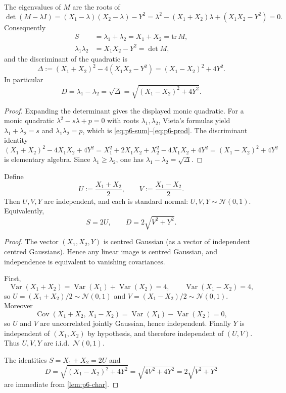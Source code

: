 \documentclass[11pt,a4paper]{article}
\DeclareMathOperator{\Var}{Var}
\DeclareMathOperator{\Cov}{Cov}
\begin{document}
\begin{lemma}
\label{lem:p6-char}
The eigenvalues of \(M\) are the roots of
\[
\det(M-\lambda I)
=
(X_1-\lambda)(X_2-\lambda)-Y^2
=
\lambda^2-(X_1+X_2)\lambda+(X_1X_2-Y^2)
=
0.
\]
Consequently
\begin{align}
\label{eq:p6-sum}
S
&=
\lambda_1+\lambda_2
=
X_1+X_2
=
\mathrm{tr}\,M,
\\
\label{eq:p6-prod}
\lambda_1\lambda_2
&=
X_1X_2-Y^2
=
\det M,
\end{align}
and the discriminant of the quadratic is
\begin{equation}
\label{eq:p6-delta}
\Delta
:=
(X_1+X_2)^2-4(X_1X_2-Y^2)
=
(X_1-X_2)^2+4Y^2.
\end{equation}
In particular
\begin{equation}
\label{eq:p6-diff}
D
=
\lambda_1-\lambda_2
=
\sqrt{\Delta}
=
\sqrt{(X_1-X_2)^2+4Y^2}.
\end{equation}
\end{lemma}

\begin{proof}
Expanding the determinant gives the displayed monic quadratic. For a monic quadratic \(\lambda^2-s\lambda+p=0\) with roots \(\lambda_1,\lambda_2\), Vieta's formulas yield \(\lambda_1+\lambda_2=s\) and \(\lambda_1\lambda_2=p\), which is \eqref{eq:p6-sum}--\eqref{eq:p6-prod}. The discriminant identity
\[
(X_1+X_2)^2-4X_1X_2+4Y^2
=
X_1^2+2X_1X_2+X_2^2-4X_1X_2+4Y^2
=
(X_1-X_2)^2+4Y^2
\]
is elementary algebra. Since \(\lambda_1\ge\lambda_2\), one has \(\lambda_1-\lambda_2=\sqrt{\Delta}\).
\end{proof}

\begin{lemma}
\label{lem:p6-UV}
Define
\[
U
:=
\frac{X_1+X_2}{2},
\qquad
V
:=
\frac{X_1-X_2}{2}.
\]
Then \(U,V,Y\) are independent, and each is standard normal: \(U,V,Y\sim\mathcal{N}(0,1)\). Equivalently,
\[
S=2U,
\qquad
D=2\sqrt{V^2+Y^2}.
\]
\end{lemma}

\begin{proof}
The vector \((X_1,X_2,Y)\) is centred Gaussian (as a vector of independent centred Gaussians). Hence any linear image is centred Gaussian, and independence is equivalent to vanishing covariances.

First,
\[
\Var(X_1+X_2)
=
\Var(X_1)+\Var(X_2)
=
4,
\qquad
\Var(X_1-X_2)
=
4,
\]
so \(U=(X_1+X_2)/2\sim\mathcal{N}(0,1)\) and \(V=(X_1-X_2)/2\sim\mathcal{N}(0,1)\). Moreover
\[
\Cov(X_1+X_2,\,X_1-X_2)
=
\Var(X_1)-\Var(X_2)
=
0,
\]
so \(U\) and \(V\) are uncorrelated jointly Gaussian, hence independent. Finally \(Y\) is independent of \((X_1,X_2)\) by hypothesis, and therefore independent of \((U,V)\). Thus \(U,V,Y\) are i.i.d.\ \(\mathcal{N}(0,1)\).

The identities \(S=X_1+X_2=2U\) and
\[
D
=
\sqrt{(X_1-X_2)^2+4Y^2}
=
\sqrt{4V^2+4Y^2}
=
2\sqrt{V^2+Y^2}
\]
are immediate from \cref{lem:p6-char}.
\end{proof}
\end{document}
